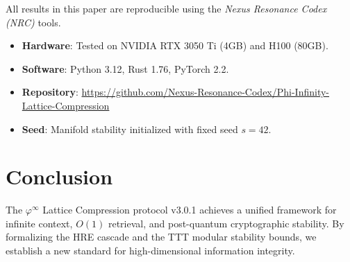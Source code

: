 \documentclass[11pt,a4paper,oneside]{article}
\theoremstyle{definition}
\theoremstyle{remark}
\newcommand{\phiinf}{\varphi^\infty}
\begin{document}
All results in this paper are reproducible using the \textit{Nexus Resonance Codex (NRC)} tools. 
\begin{itemize}
    \item \textbf{Hardware}: Tested on NVIDIA RTX 3050 Ti (4GB) and H100 (80GB).
    \item \textbf{Software}: Python 3.12, Rust 1.76, PyTorch 2.2.
    \item \textbf{Repository}: \url{https://github.com/Nexus-Resonance-Codex/Phi-Infinity-Lattice-Compression}
    \item \textbf{Seed}: Manifold stability initialized with fixed seed $s=42$.
\end{itemize}

\section{Conclusion}

The $\phiinf$ Lattice Compression protocol v3.0.1 achieves a unified framework for infinite context, $O(1)$ retrieval, and post-quantum cryptographic stability. By formalizing the HRE cascade and the TTT modular stability bounds, we establish a new standard for high-dimensional information integrity.



\end{document}
